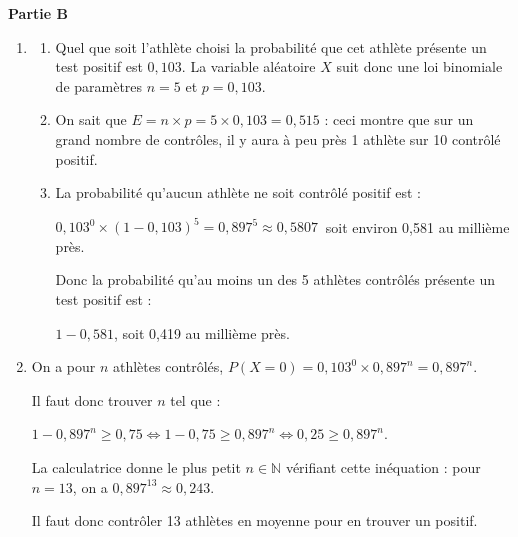 \documentclass[10pt]{article}
\providecommand{\N}{\mathbb{N}}
\providecommand{\np}[2][]{{#2~#1}}
\begin{document}
\bigskip

\textbf{Partie B}

\medskip



\medskip

\begin{enumerate}
\item 


	\begin{enumerate}
		\item 
		Quel que soit l'athlète choisi la probabilité que cet  athlète présente un test positif est $0,103$. La variable aléatoire $X$ suit donc une loi binomiale de paramètres $n = 5$ et $p = 0,103$.
		\item 
On sait que $E = n \times p = 5 \times 0,103 = 0,515$ : ceci montre que sur un grand nombre de contrôles, il y aura à peu près 1 athlète sur 10 contrôlé positif.
		\item 
La probabilité qu'aucun athlète ne soit contrôlé positif est :

$0,103^0 \times (1 - 0,103)^5 = 0,897^5 \approx \np{0,5807}$ soit environ 0,581 au millième près.

Donc la probabilité qu'au moins un des 5 athlètes contrôlés présente un test positif est :

$1 - 0,581$, soit 0,419 au millième près.
	\end{enumerate}
\item 
On a pour $n$ athlètes contrôlés, $P(X = 0) = 0,103^0 \times 0,897^n = 0,897^n$.

Il faut donc trouver $n$ tel que :

$1 - 0,897^n \geqslant 0,75 \iff 1 - 0,75 \geqslant 0,897^n \iff 0,25 \geqslant 0,897^n$.

La calculatrice donne le plus petit $n \in \N$ vérifiant cette inéquation : pour $n = 13$, on a $0,897^{13} \approx 0,243$.

Il faut donc contrôler 13 athlètes en moyenne pour en trouver un positif.
\end{enumerate}
\vspace{0,5cm}
\bigskip
\end{document}
